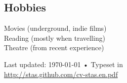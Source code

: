 \documentclass[10pt, a4paper]{article}
\begin{document}
\subsection*{Hobbies}
 Movies (underground, indie films)\\
Reading (mostly when travelling)\\
Theatre (from recent experience)


\vfill{}

\begin{center}
{\scriptsize  Last updated: \today\- •\- 
Typeset in \href{http://nitens.org/taraborelli/cvtex}{
\XeTeX }\\
\href{http://stas.github.com/cv-stas.en.pdf}{http://stas.github.com/cv-stas.en.pdf}}
\end{center}
\end{document}
